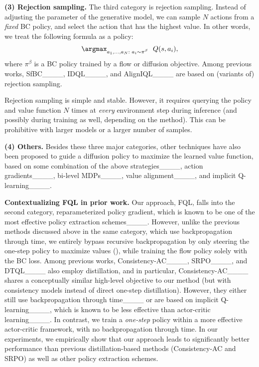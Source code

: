 \textbf{(3) Rejection sampling.}
The third category is rejection sampling.
Instead of adjusting the parameter of the generative model,
we can sample $N$ actions from a \emph{fixed} BC policy, and select the action that has the highest value.
In other words, we treat the following formula as a policy:
\begin{align}
    \argmax_{\substack{a_1, \dots, a_N \text{$:$ } a_i \sim \pi^\beta}} \ \ Q(s, a_i), \label{eq:rejection}
\end{align}
where $\pi^\beta$ is a BC policy trained by a flow or diffusion objective.
Among previous works, 
SfBC____,
IDQL____,
and AlignIQL____
are based on (variants of) rejection sampling.

Rejection sampling is simple and stable.
However, it requires querying the policy and value function $N$ times
at \emph{every} environment step during inference (and possibly during training as well, depending on the method).
This can be prohibitive with larger models or a larger number of samples.
%

%

%
%
%
%
%
%
%

\textbf{(4) Others.}
Besides these three major categories,
other techniques have also been proposed to guide a diffusion policy to maximize the learned value function,
based on some combination of the above strategies____,
action gradients____,
bi-level MDPs____,
value alignment____,
and implicit Q-learning____.

\textbf{Contextualizing FQL in prior work.}
Our approach, FQL, falls into the second category, reparameterized policy gradient,
which is known to be one of the most effective policy extraction schemes____.
However, unlike the previous methods discussed above in the same category, which use backpropagation through time,
we entirely bypass recursive backpropagation
by only steering the one-step policy to maximize values (),
while training the flow policy solely with the BC loss.
%
%
%
%
Among previous works,
Consistency-AC____, SRPO____, and DTQL____
also employ distillation,
and in particular, Consistency-AC____ shares a conceptually similar high-level objective to our method
(but with consistency models instead of direct one-step distillation).
However, they either still use backpropagation through time____
or are based on implicit Q-learning____,
which is known to be less effective than actor-critic learning____.
In contrast, we train a \emph{one-step} policy within a more effective actor-critic framework,
with no backpropagation through time.
In our experiments,
we empirically show that our approach leads to significantly better performance
than previous distillation-based methods (Consistency-AC and SRPO) as well as other policy extraction schemes.
%

